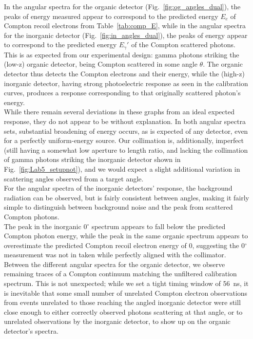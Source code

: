 \documentclass[12pt]{article}
\newcommand{\figref}[1]{Fig.~\ref{#1}}
\newcommand{\degr}{$^\circ$\xspace}
\begin{document}
In the angular spectra for the organic detector (\figref{fig:og_angles_dual}), the peaks of energy measured appear to correspond to the predicted energy $E_e$ of Compton recoil electrons from Table~\ref{tab:comp_E}, while in the angular spectra for the inorganic detector (\figref{fig:in_angles_dual}), the peaks of energy appear to correspond to the predicted energy $E_\gamma'$ of the Compton scattered photons.
This is as expected from our experimental design: gamma photons striking the (low-z) organic detector, being Compton scattered in some angle $\theta$.
The organic detector thus detects the Compton electrons and their energy, while the (high-z) inorganic detector, having strong photoelectric response as seen in the calibration curves, produces a response corresponding to that originally scattered photon's energy.\\

While there remain several deviations in these graphs from an ideal expected response, they do not appear to be without explanation.
In both angular spectra sets, substantial broadening of energy occurs, as is expected of any detector, even for a perfectly uniform-energy source.
Our collimation is, additionally, imperfect (still having a somewhat low aperture to length ratio, and lacking the collimation of gamma photons striking the inorganic detector shown in \figref{fig:Lab5_setupnot}), and we would expect a slight additional variation in scattering angles observed from a target angle.
\\

For the angular spectra of the inorganic detectors' response, the background radiation can be observed, but is fairly consistent between angles, making it fairly simple to distinguish between background noise and the peak from scattered Compton photons.\\
The peak in the inorganic 0\degr spectrum appears to fall below the predicted Compton photon energy, while the peak in the same organic spectrum appears to overestimate the predicted Compton recoil electron energy of 0, suggesting the 0\degr measurement was not in taken while perfectly aligned with the collimator.
Between the different angular spectra for the organic detector, we observe remaining traces of a Compton continuum matching the unfiltered calibration spectrum.
This is not unexpected; while we set a tight timing window of 56~ns, it is inevitable that some small number of unrelated Compton electron observations from events unrelated to those reaching the angled inorganic detector were still close enough to either correctly observed photons scattering at that angle, or to unrelated observations by the inorganic detector, to show up on the organic detector's spectra.
\end{document}

